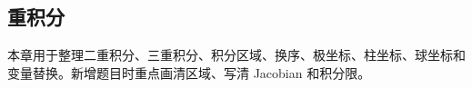 \subsection{重积分}

\begin{knowledgeBox}
本章用于整理二重积分、三重积分、积分区域、换序、极坐标、柱坐标、球坐标和变量替换。新增题目时重点画清区域、写清 Jacobian 和积分限。
\end{knowledgeBox}
